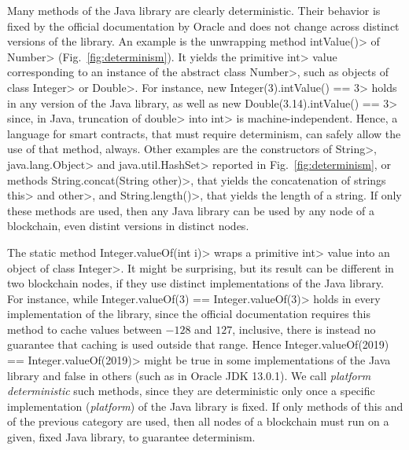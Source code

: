 Many methods of the Java library are clearly deterministic. Their behavior is fixed
by the official documentation by Oracle
and does not change across distinct versions of the library. An example is the unwrapping
method \<intValue()> of \<Number> (Fig.~\ref{fig:determinism}). It yields
the primitive \<int> value corresponding to an instance of the abstract class \<Number>, such
as objects of class \<Integer> or \<Double>. For instance,
\<new Integer(3).intValue() == 3>
holds in any version of the Java library, as well as
\<new Double(3.14).intValue() == 3>
since, in Java, truncation of \<double> into \<int> is machine-independent.
Hence, a language for smart contracts, that must require determinism,
can safely allow the use of that method, always. Other examples
are the constructors of \<String>, \<java.lang.Object> and \<java.util.HashSet>
reported in Fig.~\ref{fig:determinism}, or methods
\<String.concat(String other)>, that yields the concatenation of strings \<this> and \<other>,
and \<String.length()>, that yields the length of a string.
If only these methods are used, then any Java library can be used by any node of a blockchain,
even distint versions in distinct nodes.

The static method \<Integer.valueOf(int i)> wraps
a primitive \<int> value into an object of class \<Integer>. It might be surprising,
but its result can be different in two blockchain nodes, if they
use distinct implementations of the Java library. For instance, while
\<Integer.valueOf(3) == Integer.valueOf(3)>
holds in every implementation of the library, since the official documentation requires this method
to cache values between $-128$ and $127$, inclusive, there is instead no guarantee that caching is
used outside that range. Hence
\<Integer.valueOf(2019) == Integer.valueOf(2019)>
might be true in some implementations of the Java library
and false in others (such as in Oracle JDK 13.0.1). %
We call \emph{platform deterministic} such methods, since they are deterministic only once a specific
implementation (\emph{platform}) of the Java library is fixed.
If only methods of this and of the previous category are used, then
all nodes of a blockchain must run on a given, fixed Java library, to guarantee
determinism. %

